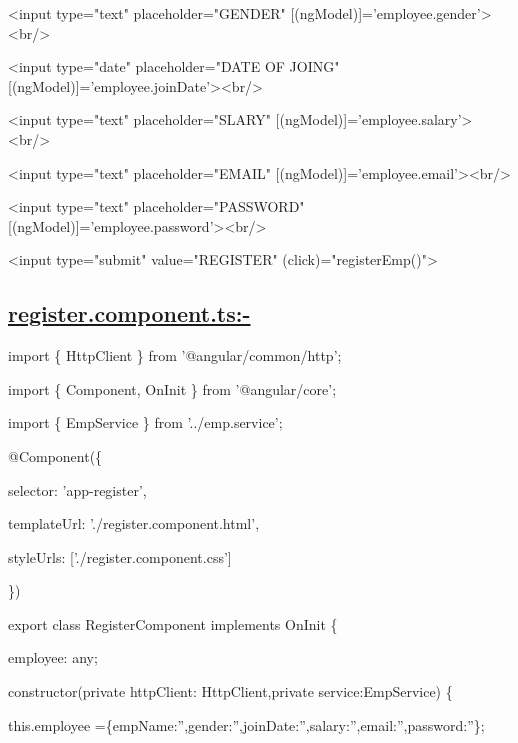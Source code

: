 \documentclass[11pt,twoside]{article}
\begin{document}
\vspace{1\baselineskip}
<input type="text" placeholder="GENDER" [(ngModel)]='employee.gender'><br/>

\vspace{1\baselineskip}
<input type="date" placeholder="DATE OF JOING" [(ngModel)]='employee.joinDate'><br/> 

\vspace{1\baselineskip}
<input type="text" placeholder="SLARY" [(ngModel)]='employee.salary'><br/>

\vspace{1\baselineskip}
<input type="text" placeholder="EMAIL" [(ngModel)]='employee.email'><br/>

\vspace{1\baselineskip}
<input type="text" placeholder="PASSWORD" [(ngModel)]='employee.password'><br/> 

\vspace{1\baselineskip}
<input type="submit" value="REGISTER" (click)="registerEmp()">

\vspace{1\baselineskip}
\subsection*{\uline{register.component.ts:-}}

import \{ HttpClient \} from '@angular/common/http';

import \{ Component, OnInit \} from '@angular/core';

import \{ EmpService \} from '../emp.service';

\vspace{1\baselineskip}
@Component(\{

  \hspace*{5}selector: 'app-register',

  \hspace*{5}templateUrl: './register.component.html',

  \hspace*{5}styleUrls: ['./register.component.css']

\})

export class RegisterComponent implements OnInit \{

  \hspace*{5}employee: any;

  \hspace*{5}constructor(private httpClient: HttpClient,private service:EmpService) \{

    \hspace*{10}this.employee =\{empName:'',gender:'',joinDate:'',salary:'',email:'',password:''\};
\end{document}
